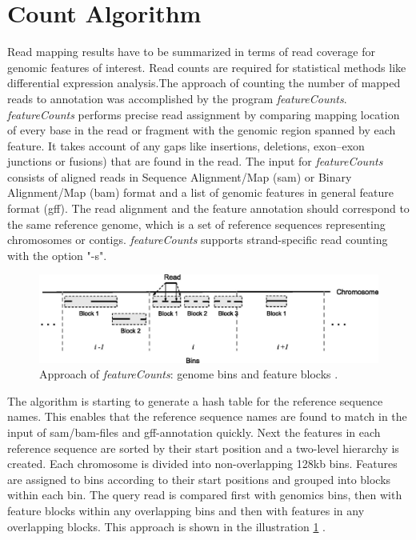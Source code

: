 \documentclass[12pt, a4paper]{report}
\begin{document}
\section{Count Algorithm}\label{featurecount}
Read mapping results have to be summarized in terms of read coverage for genomic features of interest. Read counts are required for statistical methods like differential expression analysis.The approach of counting the number of mapped reads to annotation was accomplished by the program \textit{featureCounts}. \\
\textit{featureCounts} performs precise read assignment by comparing mapping location of every base in the read or fragment with the genomic region spanned by each feature. It takes account of any gaps like insertions, deletions, exon–exon junctions or fusions) that are found in the read. 
The input for \textit{featureCounts} consists of aligned reads in Sequence Alignment/Map (sam) or Binary Alignment/Map (bam) format and a list of genomic features in general feature format (gff). The read alignment and the feature annotation should correspond to the same reference genome, which is a set of reference sequences representing chromosomes or contigs. \textit{featureCounts} supports strand-specific read counting with the option "-s". 
\begin{figure}[ht]
	\centering	
	\includegraphics[width=400pt]{pics/featurecounts}
	\caption[Approach of software \textit{featureCounts}]
	{Approach of \textit{featureCounts}: genome bins and feature blocks \cite{Liao2014}. }
	\label{fig:featurecounts}
\end{figure}

The algorithm is starting to generate a hash table for the reference sequence names. This enables that the reference sequence names are found to match in the input of sam/bam-files and gff-annotation quickly. Next the features in each reference sequence are sorted by their start position and a two-level hierarchy is created. Each chromosome is divided into non-overlapping 128kb bins. Features are assigned to bins according to their start positions and grouped into blocks within each bin. The query read is compared first with genomics bins, then with feature blocks within any overlapping bins and then with features in any overlapping blocks. This approach is shown in the illustration \ref{fig:featurecounts} \cite{Liao2014}. 
\end{document}
